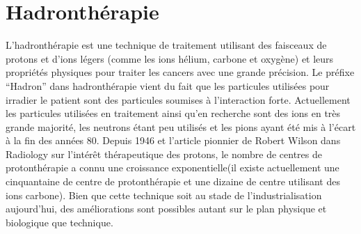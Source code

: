 \documentclass[11pt,a4paper,oldfontcommands]{memoir}
\begin{document}
\section{Hadronthérapie}
L'hadronthérapie est une technique de traitement utilisant des faisceaux de protons et d'ions légers (comme les ions hélium, carbone et oxygène) et leurs propriétés physiques pour traiter les cancers avec une grande précision. Le préfixe \enquote{Hadron} dans hadronthérapie vient du fait que les particules utilisées pour irradier le patient sont des particules soumises à l'interaction forte. Actuellement les particules utilisées en traitement ainsi qu'en recherche sont des ions en très grande majorité, les neutrons étant peu utilisés et les pions ayant été mis à l'écart à la fin des années 80. Depuis 1946 et l'article pionnier de Robert Wilson dans Radiology\cite{wilson} sur l'intérêt thérapeutique des protons, le nombre de centres de protonthérapie a connu une croissance exponentielle(il existe actuellement une cinquantaine de centre de protonthérapie et une dizaine de centre utilisant des ions carbone). Bien que cette technique soit au stade de l'industrialisation aujourd'hui, des améliorations sont possibles autant sur le plan physique et biologique que technique. 
\end{document}
